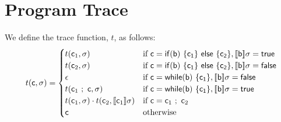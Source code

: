 \documentclass[]{article}
\newcommand{\lsyn}{[\![}
\newcommand{\rsyn}{]\!]}
\begin{document}
%
%


\section{Program Trace}

We define the trace function, $t$, as follows:
\[ 
t({\sf c},\sigma) = \begin{cases} 
t({\sf c}_1,\sigma) &
	\mbox{if } {\sf c}={\sf if (b)\ \{ c_1 \}\ else\ \{ c_2 \}},\lsyn {\sf b} \rsyn\sigma = {\sf true} \\ 
t({\sf c}_2,\sigma) &
	\mbox{if } {\sf c}={\sf if (b)\ \{ c_1 \}\ else\ \{ c_2 \}},\lsyn {\sf b} \rsyn\sigma = {\sf false} \\ 
\epsilon &
	\mbox{if } {\sf c}={\sf while (b)\ \{ c_1 \}},\lsyn {\sf b} \rsyn\sigma = {\sf false} \\ 
t({\sf c}_1\ ;\ {\sf c},\sigma) &
	\mbox{if } {\sf c}={\sf while (b)\ \{ c_1 \}},\lsyn {\sf b} \rsyn\sigma = {\sf true} \\ 
t({\sf c}_1,\sigma) \cdot t({\sf c}_2,\lsyn {\sf c}_1 \rsyn \sigma) &
	\mbox{if } {\sf c}={\sf c}_1\ ;\ {\sf c}_2 \\ 
{\sf c} & 
	\mbox{otherwise}
\end{cases}
\]
\end{document}
